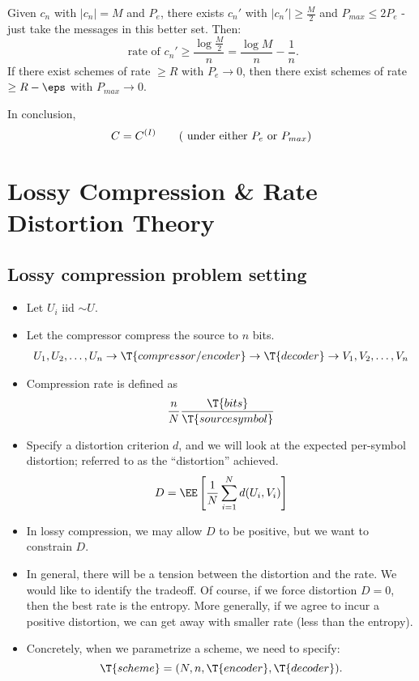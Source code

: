 \begin{remark}
\begin{enumerate}
      Given $c_n$ with $|c_n| = M$ and $P_e$, there exists $c_n'$ with $|c_n'| \geq \frac{M}{2}$ and $P_{max} \leq 2 P_e$ - just take the messages in this better set.  Then:
      \[
        \text{ rate of $c_n'$} \geq \frac{\log \frac{M}{2}}{n} = \frac{\log M}{n} - \frac{1}{n}.
      \]
      If there exist schemes of rate $\geq R$ with $P_e \to 0$, then there exist schemes of rate $\geq R - \eps$ with $P_{max} \to 0$.

      In conclusion, 
      \[
        C = C^{(I)} \tag{ under either $P_e$ or $P_{max}$}
      \]
  \end{enumerate}
\end{remark}

\section{Lossy Compression \& Rate Distortion Theory}

\subsection{Lossy compression problem setting}

\begin{itemize}
  \item Let $U_i$ iid $\sim U$.
  \item Let the compressor compress the source to $n$ bits.
\begin{align*}
  U_1, U_2, \dots, U_n \to \T{compressor / encoder} \to \T{decoder} \to V_1, V_2, \dots, V_n \\
\end{align*}
  \item Compression rate is defined as
    \begin{align*}
      \frac{n}{N} \frac{\T{bits}}{\T{source symbol}}
    \end{align*}
  \item Specify a distortion criterion $d$, and we will look at the expected per-symbol distortion; referred to as the ``distortion'' achieved.
    \begin{align*}
      D = \EE \left [ \frac{1}{N} \sum_{i=1}^{N} d(U_i, V_i) \right ]
    \end{align*}
  \item In lossy compression, we may allow $D$ to be positive, but we want to constrain $D$.
  \item In general, there will be a tension between the distortion and the rate.  We would like to identify the tradeoff.  Of course, if we force distortion $D = 0$, then the best rate is the entropy.  More generally, if we agree to incur a positive distortion, we can get away with smaller rate (less than the entropy).
  \item Concretely, when we parametrize a scheme, we need to specify:
    \[
      \T{scheme} = (N, n, \T{encoder}, \T{decoder}).
    \]
\end{itemize}

